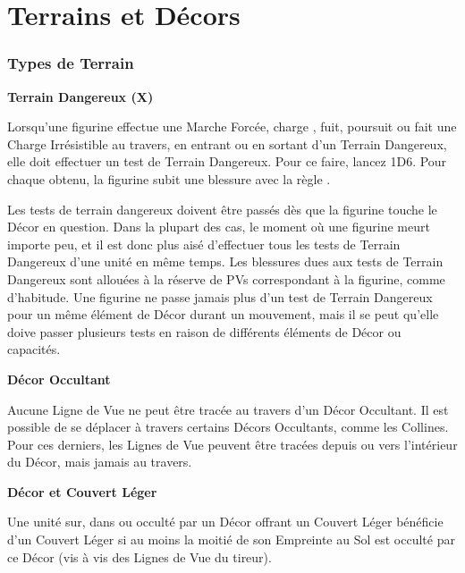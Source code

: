 
\part{Terrains et Décors}

\section{Types de Terrain}

\noindent\textbf{Terrain Dangereux (X)}

Lorsqu'une figurine effectue une Marche Forcée, charge , fuit, poursuit ou fait une Charge Irrésistible au travers, en entrant ou en sortant d'un Terrain Dangereux, elle doit effectuer un test de Terrain Dangereux. Pour ce faire, lancez 1D6.  Pour chaque  obtenu, la figurine subit une blessure avec la règle .


Les tests de terrain dangereux doivent être passés dès que la figurine touche le Décor en question. Dans la plupart des cas, le moment où une figurine meurt importe peu, et il est donc plus aisé d'effectuer tous les tests de Terrain Dangereux d'une unité en même temps. Les blessures dues aux tests de Terrain Dangereux sont allouées à la réserve de PVs correspondant à la figurine, comme d'habitude. Une figurine ne passe jamais plus d'un test de Terrain Dangereux pour un même élément de Décor durant un mouvement, mais il se peut qu'elle doive passer plusieurs tests en raison de différents éléments de Décor ou capacités.

\noindent\textbf{Décor Occultant}

Aucune Ligne de Vue ne peut être tracée au travers d'un Décor Occultant. Il est possible de se déplacer à travers certains Décors Occultants, comme les Collines. Pour ces derniers, les Lignes de Vue peuvent être tracées depuis ou vers l'intérieur du Décor, mais jamais au travers. 

\noindent\textbf{Décor et Couvert Léger}

Une unité sur, dans ou occulté par un Décor offrant un Couvert Léger bénéficie d'un Couvert Léger si au moins la moitié de son Empreinte au Sol est occulté par ce Décor (vis à vis des Lignes de Vue du tireur). 

